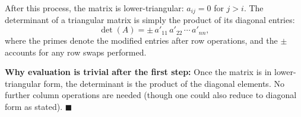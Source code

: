 \documentclass[12pt]{article}
\begin{document}
After this process, the matrix is lower-triangular: $a_{ij} = 0$ for $j > i$. The determinant of a triangular matrix is simply the product of its diagonal entries:
\[
\det(A) = \pm\, a'_{11}\, a'_{22}\, \cdots\, a'_{nn},
\]
where the primes denote the modified entries after row operations, and the $\pm$ accounts for any row swaps performed.

\medskip
\textbf{Why evaluation is trivial after the first step:} Once the matrix is in lower-triangular form, the determinant is the product of the diagonal elements. No further column operations are needed (though one could also reduce to diagonal form as stated). \hfill $\blacksquare$
\end{document}
